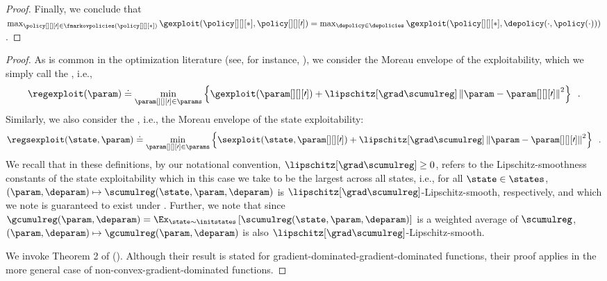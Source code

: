 \begin{proof}
    Finally, we conclude that $\max_{\policy[][][\prime] \in \fmarkovpolicies (\policy[][][*])} \gexploit (\policy[][][*], \policy[][][\prime]) = \max_{\depolicy \in \depolicies} \gexploit (\policy[][][*], \depolicy (\cdot, \policy (\cdot)))$. 
\end{proof}


\thmconvergence*
\begin{proof}
As is common in the optimization literature (see, for instance, \citet{davis2018subgradient}), %
we consider the Moreau envelope of the exploitability, which we simply call the , i.e., $$\regexploit (\param) \doteq \min_{\param[][][\prime] \in \params} \left\{ \gexploit (\param[][][\prime]) + \lipschitz[{\grad \scumulreg}] \left\| \param - \param[][][\prime] \right\|^2\right\} \enspace .$$ 
Similarly, we also consider the , i.e., the Moreau envelope of the state exploitability: $$\regsexploit (\state, \param) \doteq \min_{\param[][][\prime] \in \params} \left\{ \sexploit (\state, \param[][][\prime]) + \lipschitz[{\grad \scumulreg}] \left\| \param - \param[][][\prime] \right\|^2\right\} \enspace .$$
We recall that in these definitions, by our notational convention, $\lipschitz[{\grad \scumulreg}] \geq 0$, refers to the Lipschitz-smoothness constants of the state exploitability which in this case we take to be the largest across all states, i.e., for all $\state \in \states$, $(\param, \deparam) \mapsto \scumulreg(\state, \param, \deparam)$ is $\lipschitz[{\grad \scumulreg}]$-Lipschitz-smooth, respectively, and which we note is guaranteed to exist under . Further, we note that since $\gcumulreg(\param, \deparam) = \Ex_{\state \sim \initstates} \left[\scumulreg(\state, \param, \deparam) \right]$ is a weighted average of $\scumulreg$, $(\param, \deparam) \mapsto \gcumulreg(\param, \deparam)$ is also $\lipschitz[{\grad \scumulreg}]$-Lipschitz-smooth.

We invoke Theorem 2 of \citeauthor{daskalakis2020independent}
(\citeyear{daskalakis2020independent}).
Although their result is stated for gradient-dominated-gradient-dominated functions, their proof applies in the more general case of non-convex-gradient-dominated functions.
    

\end{proof}
